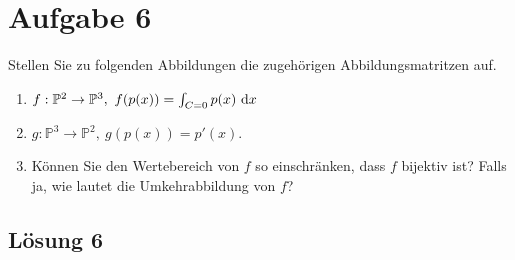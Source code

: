 \documentclass[main.tex]{subfiles}
\begin{document}
\section{Aufgabe 6}
Stellen Sie zu folgenden Abbildungen die zugehörigen Abbildungsmatritzen auf.

\begin{enumerate}
    \item $f: \mathbb{P}^2 \to \mathbb{P}^3, \ f(p(x)) = \int_{C=0} p(x) \dx$
    \item $g: \mathbb{P}^3 \to \mathbb{P}^2, \ g(p(x)) = p'(x).$
    \item Können Sie den Wertebereich von $f$ so einschränken, dass $f$ bijektiv ist? Falls ja, wie lautet die Umkehrabbildung von $f$?
\end{enumerate}

\subsection{Lösung 6}
\end{document}
